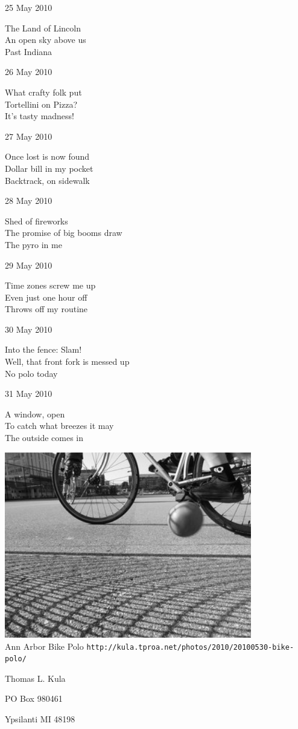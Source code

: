 \documentclass[12pt]{article}
\begin{document}
\newpage

25 May 2010

The Land of Lincoln \\
An open sky above us \\
Past Indiana

26 May 2010

What crafty folk put \\
Tortellini on Pizza? \\
It's tasty madness!

27 May 2010 

Once lost is now found \\
Dollar bill in my pocket \\
Backtrack, on sidewalk

28 May 2010

Shed of fireworks \\
The promise of big booms draw \\
The pyro in me

29 May 2010

Time zones screw me up \\
Even just one hour off \\
Throws off my routine

30 May 2010

Into the fence: Slam! \\
Well, that front fork is messed up \\
No polo today

31 May 2010

A window, open \\
To catch what breezes it may \\
The outside comes in


\newpage

\begin{center}
\includegraphics[width=4.25in]{a2bp.jpg} \\[1cm]

Ann Arbor Bike Polo
\small{{\tt http://kula.tproa.net/photos/2010/20100530-bike-polo/}}

\end{center}

\newpage

\thispagestyle{empty}
\vspace*{14cm}
\begin{sideways}
\Large{Thomas L. Kula}
\end{sideways}
\begin{sideways}
\Large{PO Box 980461}
\end{sideways}
\begin{sideways}
\Large{Ypsilanti MI 48198}
\end{sideways}
\end{document}
